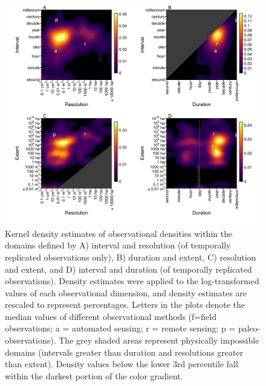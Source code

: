 \documentclass[12pt]{article}
\begin{document}
\begin{figure}[!ht]
\includegraphics[width=1\textwidth]{../vignettes/figures/fig2.png}
\vspace{-0.15 cm}
\caption{Kernel density estimates of observational densities within the domains defined by A) interval and resolution (of temporally replicated observations only), B) duration and extent, C) resolution and extent, and D) interval and duration (of temporally replicated observations). Density estimates were applied to the log-transformed values of each observational dimension, and density estimates are rescaled to represent percentages. Letters in the plots denote the median values of different observational methods (f=field observations; a = automated sensing; r = remote sensing; p = paleo-observations). The grey shaded areas represent physically impossible domains (intervals greater than duration and resolutions greater than extent). Density values below the lower 3rd percentile fall within the darkest portion of the color gradient.}
\label{afoto1}
\end{figure}
\end{document}
